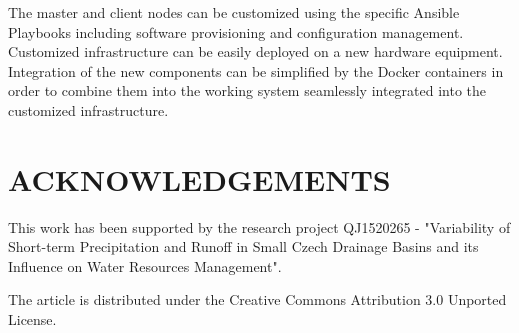 \documentclass{isprs}
\begin{document}
The master and client nodes can be customized using the specific Ansible
Playbooks including software provisioning and configuration
management. Customized infrastructure can be easily deployed on a new
hardware equipment. Integration of the new components can be simplified by
the Docker containers in order to combine them into the working system
seamlessly integrated into the customized infrastructure.

{%
  \begin{spacing}{0.9}%
     
  \end{spacing}
}

\section*{ACKNOWLEDGEMENTS}\label{ACKNOWLEDGEMENTS}

This work has been supported by the research project QJ1520265 -
"Variability of Short-term Precipitation and Runoff in Small Czech
Drainage Basins and its Influence on Water Resources Management".

The article is distributed under the Creative Commons Attribution 3.0
Unported License.
\end{document}
